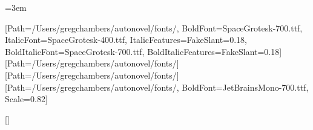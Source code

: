 \usepackage{fontspec}
\usepackage{xcolor}
\usepackage[paperwidth=6in,paperheight=9in,
            inner=0.7in,outer=0.5in,top=0.65in,bottom=0.65in]{geometry}
\usepackage{titlesec}
\usepackage{fancyhdr}
\usepackage{microtype}
\usepackage{fvextra}          %
\usepackage{adjustbox}        %
\usepackage{etoolbox}
\emergencystretch=3em   %
\AtBeginDocument{\hypersetup{hidelinks}}  %

\color{ink}

\def\fontsdir{/Users/gregchambers/autonovel/fonts/}
\setmainfont{SpaceGrotesk-400.ttf}[Path=\fontsdir,
  BoldFont=SpaceGrotesk-700.ttf,
  ItalicFont=SpaceGrotesk-400.ttf, ItalicFeatures={FakeSlant=0.18},
  BoldItalicFont=SpaceGrotesk-700.ttf, BoldItalicFeatures={FakeSlant=0.18}]
\newfontfamily{}[Path=\fontsdir]
\newfontfamily{}[Path=\fontsdir]
\setmonofont{JetBrainsMono-400.ttf}[Path=\fontsdir, BoldFont=JetBrainsMono-700.ttf, Scale=0.82]

\setlength{\parindent}{0pt}\setlength{\parskip}{5pt}\linespread{1.05}

\titleformat{\section}{\displaysemi\large\raggedright}{}{0pt}{\MakeUppercase}[{\titlerule[0.8pt]}]
\titlespacing*{\section}{0pt}{14pt}{6pt}
\titleformat{\subsection}{\displaysemi\normalsize\raggedright}{}{0pt}{}
\titlespacing*{\subsection}{0pt}{10pt}{3pt}
\titleformat{\subsubsection}{\bfseries\raggedright}{}{0pt}{}

